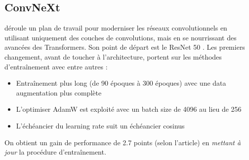 \documentclass{beamer}
\begin{document}
\subsection{ConvNeXt}

\begin{frame}{}{}
	\cite{liu2022convnet} déroule un plan de travail pour moderniser les réseaux convolutionnels en utilisant uniquement des couches de convolutions, mais en se nourrissant des avancées des Transformers. Son point de départ est le ResNet 50 \cite{he2016deep}. Les premiers changement, avant de toucher à l'architecture, portent sur les méthodes d'entraînement avec entre autres :\newline
	
	\begin{itemize}
		\item Entraînement plus long (de 90 époques à 300 époques) avec une data augmentation plus complète
		\item L'optimiser AdamW est exploité avec un batch size de 4096 au lieu de 256
		\item L'échéancier du learning rate suit un échéancier cosinus\newline
	\end{itemize}
	
	On obtient un gain de performance de 2.7 points (selon l'article) en \textit{mettant à jour} la procédure d'entraînement.
\end{frame}
\end{document}
